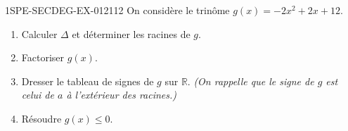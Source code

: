 \begin{exercice}{1SPE-SECDEG-EX-012}{1}{12}
On considère le trinôme $g(x) = -2x^2 + 2x + 12$.

\begin{enumerate}
  \item Calculer $\Delta$ et déterminer les racines de $g$.
  \item Factoriser $g(x)$.
  \item Dresser le tableau de signes de $g$ sur $\mathbb{R}$. \textit{(On rappelle que le signe de $g$ est celui de $a$ à l'extérieur des racines.)}
  \item Résoudre $g(x) \leqslant 0$.
\end{enumerate}
\end{exercice}
